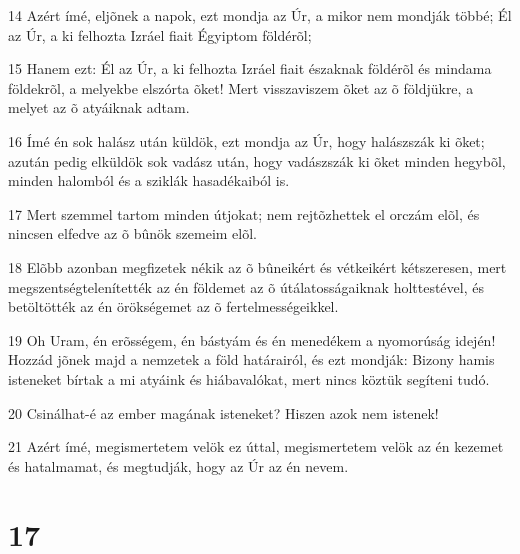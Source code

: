 \par 14 Azért ímé, eljõnek a napok, ezt mondja az Úr, a mikor nem mondják többé; Él az Úr, a ki felhozta Izráel fiait Égyiptom földérõl;
\par 15 Hanem ezt: Él az Úr, a ki felhozta Izráel fiait északnak földérõl és mindama földekrõl, a melyekbe elszórta õket! Mert visszaviszem õket az  õ földjükre, a melyet az õ atyáiknak adtam.
\par 16 Ímé én sok halász után küldök, ezt mondja az Úr, hogy halászszák ki õket; azután pedig elküldök sok vadász után, hogy vadászszák ki õket minden hegybõl, minden halomból és a sziklák hasadékaiból is.
\par 17 Mert szemmel tartom minden útjokat; nem rejtõzhettek el orczám elõl, és nincsen elfedve az õ bûnök szemeim elõl.
\par 18 Elõbb azonban megfizetek nékik az õ bûneikért és vétkeikért kétszeresen, mert megszentségtelenítették az én földemet az õ útálatosságaiknak holttestével, és betöltötték az én örökségemet az õ fertelmességeikkel.
\par 19 Oh Uram, én erõsségem, én bástyám és én menedékem a nyomorúság idején! Hozzád jõnek majd a nemzetek a föld határairól, és ezt mondják: Bizony hamis isteneket bírtak a mi atyáink és hiábavalókat, mert nincs köztük segíteni tudó.
\par 20 Csinálhat-é az ember magának isteneket? Hiszen azok nem istenek!
\par 21 Azért ímé, megismertetem velök ez úttal, megismertetem velök az én kezemet és hatalmamat, és megtudják, hogy az Úr az én nevem.

\chapter{17}

